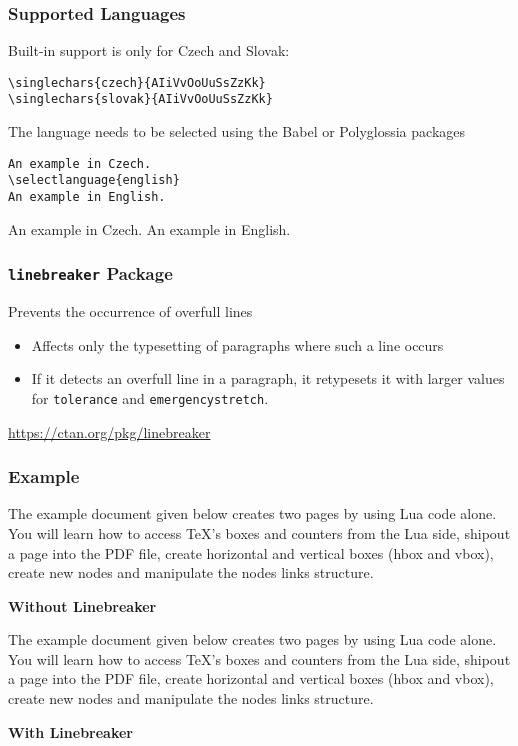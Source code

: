 \begin{frame}[fragile]
  \frametitle{Supported Languages}
  Built-in support is only for Czech and Slovak:

\begin{verbatim}
\singlechars{czech}{AIiVvOoUuSsZzKk}
\singlechars{slovak}{AIiVvOoUuSsZzKk}
\end{verbatim}

The language needs to be selected using the Babel or Polyglossia packages

\begin{verbatim}
An example in Czech.
\selectlanguage{english}
An example in English.
\end{verbatim}

    \preventsingledebugon

An example in Czech.
An example in English.

    \preventsingledebugoff


\end{frame}

\newcommand\testbox[1]{%
  \parbox{150pt}{%
    \parindent=15pt%
    \tolerance=1%
    \pretolerance=1%
    #1
  }%
}

\newcommand\printtest[1]{%
  \linebreakerdisable%
  \noindent\testbox{%
    #1
    \par\medskip\noindent\hfill\textbf{Without Linebreaker}\hfill\null
  }%
  \linebreakerenable%
  \hfill%
  \testbox{%
    #1
    \par\medskip\noindent\hfill\textbf{With Linebreaker}\hfill\null
  }%
}

\begin{frame}[fragile]
  \frametitle{\texttt{linebreaker} Package}
  Prevents the occurrence of overfull lines
  \begin{itemize}
    \item Affects only the typesetting of paragraphs where such a line occurs
    \item If it detects an overfull line in a paragraph, it retypesets it with larger values for
      \verb|tolerance| and \verb|emergencystretch|.
  \end{itemize}
  \url{https://ctan.org/pkg/linebreaker}
\end{frame}

\begin{frame}
  \frametitle{Example}
  \printtest{
    The example document given below creates two pages by using Lua code alone. You
will learn how to access TeX's boxes and counters from the Lua side, shipout a
page into the PDF file, create horizontal and vertical boxes (hbox and vbox),
create new nodes and manipulate the nodes links structure. 
  }
\end{frame}

